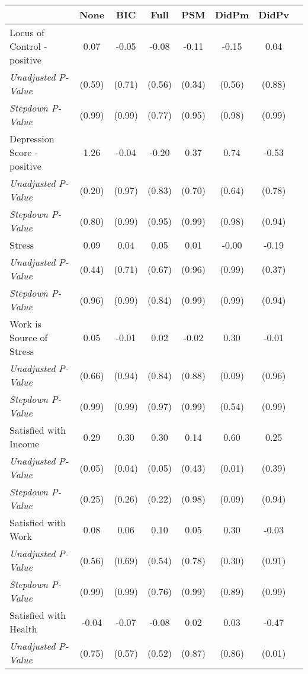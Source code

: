 \begin{tabular}{l c c c c c c c}
\toprule
 & None & BIC & Full & PSM & DidPm & DidPv \\
\midrule
Locus of Control - positive & 0.07 & -0.05 & -0.08 & -0.11 & -0.15 & 0.04 \\
\quad \textit{Unadjusted P-Value} & (0.59) & (0.71) & (0.56) & (0.34) & (0.56) & (0.88) \\
\quad \textit{Stepdown P-Value} & (0.99) & (0.99) & (0.77) & (0.95) & (0.98) & (0.99) \\
Depression Score - positive & 1.26 & -0.04 & -0.20 & 0.37 & 0.74 & -0.53 \\
\quad \textit{Unadjusted P-Value} & (0.20) & (0.97) & (0.83) & (0.70) & (0.64) & (0.78) \\
\quad \textit{Stepdown P-Value} & (0.80) & (0.99) & (0.95) & (0.99) & (0.98) & (0.94) \\
Stress & 0.09 & 0.04 & 0.05 & 0.01 & -0.00 & -0.19 \\
\quad \textit{Unadjusted P-Value} & (0.44) & (0.71) & (0.67) & (0.96) & (0.99) & (0.37) \\
\quad \textit{Stepdown P-Value} & (0.96) & (0.99) & (0.84) & (0.99) & (0.99) & (0.94) \\
Work is Source of Stress & 0.05 & -0.01 & 0.02 & -0.02 & 0.30 & -0.01 \\
\quad \textit{Unadjusted P-Value} & (0.66) & (0.94) & (0.84) & (0.88) & (0.09) & (0.96) \\
\quad \textit{Stepdown P-Value} & (0.99) & (0.99) & (0.97) & (0.99) & (0.54) & (0.99) \\
Satisfied with Income & 0.29 & 0.30 & 0.30 & 0.14 & 0.60 & 0.25 \\
\quad \textit{Unadjusted P-Value} & (0.05) & (0.04) & (0.05) & (0.43) & (0.01) & (0.39) \\
\quad \textit{Stepdown P-Value} & (0.25) & (0.26) & (0.22) & (0.98) & (0.09) & (0.94) \\
Satisfied with Work & 0.08 & 0.06 & 0.10 & 0.05 & 0.30 & -0.03 \\
\quad \textit{Unadjusted P-Value} & (0.56) & (0.69) & (0.54) & (0.78) & (0.30) & (0.91) \\
\quad \textit{Stepdown P-Value} & (0.99) & (0.99) & (0.76) & (0.99) & (0.89) & (0.99) \\
Satisfied with Health & -0.04 & -0.07 & -0.08 & 0.02 & 0.03 & -0.47 \\
\quad \textit{Unadjusted P-Value} & (0.75) & (0.57) & (0.52) & (0.87) & (0.86) & (0.01) \\

\end{tabular}
